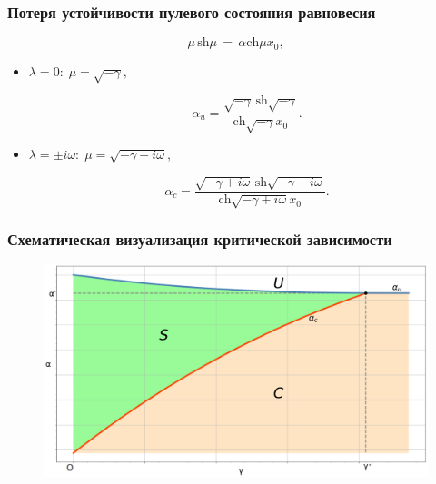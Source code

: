 \documentclass[fullscreen=true, unicode, bookmarks=false]{beamer}
\begin{document}
\begin{frame}
\frametitle{ Потеря устойчивости нулевого состояния равновесия }
 
\begin{equation}
	\mu \, \mbox{sh} \mu \, = \, \alpha \mbox{ch} \mu x_0,
\end{equation}

\medskip
\pause

\begin{itemize}

\item { $ \lambda = 0: \; \mu = \sqrt{-\gamma}, $ 
}

$$ \alpha_u = \frac{ \sqrt{-\gamma} \, \mbox{sh} \sqrt{-\gamma} }{ \mbox{ch} \sqrt{-\gamma} x_0 }. $$

\pause
\item { $ \lambda = \pm i \omega: \; \mu = \sqrt{-\gamma + i \omega}, $ 
}

$$ \alpha_c = \frac{ \sqrt{-\gamma + i \omega} \, \mbox{sh} \sqrt{-\gamma + i \omega} }{ \mbox{ch} \sqrt{-\gamma + i \omega} x_0 }. $$

\end{itemize}	

\end{frame}

\begin{frame}
\frametitle{ Схематическая визуализация критической зависимости }

\begin{figure} 
\includegraphics[scale=0.35]{scheme.png}  
\end{figure}

\end{frame}
\end{document}

